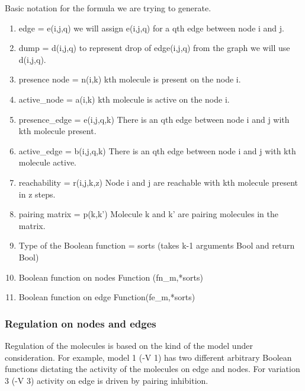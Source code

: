 Basic notation for the formula we are trying to generate.
\begin{enumerate}

\item edge = e(i,j,q)      
      we will assign e(i,j,q) for a qth edge between node i and j.

\item dump = d(i,j,q)
      to represent drop of edge(i,j,q) from the graph we will use d(i,j,q).        
       
\item presence node = n(i,k) 
	  kth molecule is present on the node i.
      
\item active\_node = a(i,k) 
      kth molecule is active on the node i.
      
\item presence\_edge = e(i,j,q,k)
      There is an qth edge between node i and j with kth molecule present.

\item active\_edge = b(i,j,q,k)
      There is an qth edge between node i and j with kth molecule active.

\item reachability = r(i,j,k,z)
      Node i and j are reachable with kth molecule present in z steps.

\item pairing matrix = p(k,k')
      Molecule k and k' are pairing molecules in the matrix.

\item Type of the Boolean function = sorts (takes k-1 arguments Bool and return Bool) 
\item Boolean function on nodes Function (fn\_{m},*sorts) 

\item Boolean function on edge Function(fe\_{m},*sorts)

\end{enumerate}

\subsubsection{Regulation on nodes and edges}
Regulation of the molecules is based on the kind of the model under consideration. For example, model 1 (-V 1) has two different arbitrary Boolean functions dictating the activity of the molecules on edge and nodes. For variation 3 (-V 3) activity on edge is driven by pairing inhibition.  

